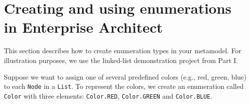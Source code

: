 \clearpage
\chapter{Creating and using enumerations in Enterprise Architect}
\genHeader

This section describes how to create enumeration types in your metamodel.
For illustration purposes, we use the linked-list demonstration project from
Part I.

Suppose we want to assign one of several predefined colors (e.g., red, green,
blue) to each \texttt{Node} in a \texttt{List}.
To represent the colors, we create an enumeration called \texttt{Color} with
three elements: \texttt{Color.RED}, \texttt{Color.GREEN} and
\texttt{Color.BLUE}.

